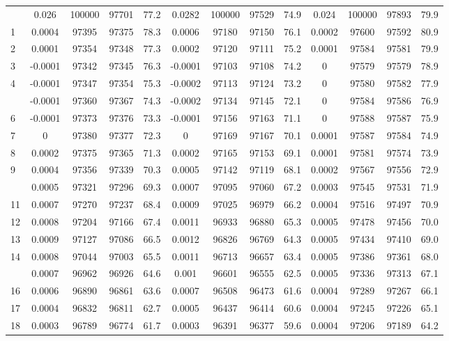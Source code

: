 \documentclass[
  14pt,
]{article}
\begin{document}
\begin{longtable}[t]{lcccccccccccc}
\endfoot
\bottomrule
\endlastfoot
0 & 0.026 & 100000 & 97701 & 77.2 & 0.0282 & 100000 & 97529 & 74.9 & 0.024 & 100000 & 97893 & 79.9\\
1 & 0.0004 & 97395 & 97375 & 78.3 & 0.0006 & 97180 & 97150 & 76.1 & 0.0002 & 97600 & 97592 & 80.9\\
2 & 0.0001 & 97354 & 97348 & 77.3 & 0.0002 & 97120 & 97111 & 75.2 & 0.0001 & 97584 & 97581 & 79.9\\
3 & -0.0001 & 97342 & 97345 & 76.3 & -0.0001 & 97103 & 97108 & 74.2 & 0 & 97579 & 97579 & 78.9\\
4 & -0.0001 & 97347 & 97354 & 75.3 & -0.0002 & 97113 & 97124 & 73.2 & 0 & 97580 & 97582 & 77.9\\
\addlinespace
5 & -0.0001 & 97360 & 97367 & 74.3 & -0.0002 & 97134 & 97145 & 72.1 & 0 & 97584 & 97586 & 76.9\\
6 & -0.0001 & 97373 & 97376 & 73.3 & -0.0001 & 97156 & 97163 & 71.1 & 0 & 97588 & 97587 & 75.9\\
7 & 0 & 97380 & 97377 & 72.3 & 0 & 97169 & 97167 & 70.1 & 0.0001 & 97587 & 97584 & 74.9\\
8 & 0.0002 & 97375 & 97365 & 71.3 & 0.0002 & 97165 & 97153 & 69.1 & 0.0001 & 97581 & 97574 & 73.9\\
9 & 0.0004 & 97356 & 97339 & 70.3 & 0.0005 & 97142 & 97119 & 68.1 & 0.0002 & 97567 & 97556 & 72.9\\
\addlinespace
10 & 0.0005 & 97321 & 97296 & 69.3 & 0.0007 & 97095 & 97060 & 67.2 & 0.0003 & 97545 & 97531 & 71.9\\
11 & 0.0007 & 97270 & 97237 & 68.4 & 0.0009 & 97025 & 96979 & 66.2 & 0.0004 & 97516 & 97497 & 70.9\\
12 & 0.0008 & 97204 & 97166 & 67.4 & 0.0011 & 96933 & 96880 & 65.3 & 0.0005 & 97478 & 97456 & 70.0\\
13 & 0.0009 & 97127 & 97086 & 66.5 & 0.0012 & 96826 & 96769 & 64.3 & 0.0005 & 97434 & 97410 & 69.0\\
14 & 0.0008 & 97044 & 97003 & 65.5 & 0.0011 & 96713 & 96657 & 63.4 & 0.0005 & 97386 & 97361 & 68.0\\
\addlinespace
15 & 0.0007 & 96962 & 96926 & 64.6 & 0.001 & 96601 & 96555 & 62.5 & 0.0005 & 97336 & 97313 & 67.1\\
16 & 0.0006 & 96890 & 96861 & 63.6 & 0.0007 & 96508 & 96473 & 61.6 & 0.0004 & 97289 & 97267 & 66.1\\
17 & 0.0004 & 96832 & 96811 & 62.7 & 0.0005 & 96437 & 96414 & 60.6 & 0.0004 & 97245 & 97226 & 65.1\\
18 & 0.0003 & 96789 & 96774 & 61.7 & 0.0003 & 96391 & 96377 & 59.6 & 0.0004 & 97206 & 97189 & 64.2\\

\end{longtable}
\end{document}
